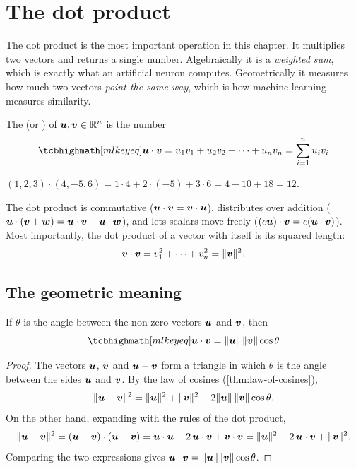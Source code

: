 \section{The dot product}\label{sec:dot-product}

\begin{motivation}
The dot product is the most important operation in this chapter. It multiplies
two vectors and returns a single number. Algebraically it is a
\emph{weighted sum}, which is exactly what an artificial neuron computes.
Geometrically it measures how much two vectors \emph{point the same way},
which is how machine learning measures similarity.
\end{motivation}

\begin{definition}\label{def:dot-product}
The  (or ) of $\bm{u}, \bm{v} \in \mathbb{R}^n$ is the
number
\[
  \keyeq{\vu \cdot \vv = u_1v_1 + u_2v_2 + \dots + u_nv_n
  = \sum_{i=1}^{n} u_iv_i}
\]
\end{definition}

\begin{example}
$(1, 2, 3)\cdot(4, -5, 6) = 1\cdot4 + 2\cdot(-5) + 3\cdot6 = 4 - 10 + 18 = 12$.
\end{example}

The dot product is commutative ($\bm{u}\cdot\bm{v} = \bm{v}\cdot\bm{u}$), distributes over
addition ($\bm{u}\cdot(\bm{v} + \bm{w}) = \bm{u}\cdot\bm{v} + \bm{u}\cdot\bm{w}$), and lets scalars
move freely ($(c\bm{u})\cdot\bm{v} = c(\bm{u}\cdot\bm{v})$). Most importantly, the dot
product of a vector with itself is its squared length:
\[
  \bm{v} \cdot \bm{v} = v_1^2 + \dots + v_n^2 = \lVert\bm{v}\rVert^2 .
\]

\subsection{The geometric meaning}

\begin{theorem}\label{thm:dot-geometric}
If $\theta$ is the angle between the non-zero vectors $\bm{u}$ and $\bm{v}$, then
\[
  \keyeq{\vu\cdot\vv = \norm{\vu}\,\norm{\vv}\cos\theta}
\]
\end{theorem}

\begin{proof}
The vectors $\bm{u}$, $\bm{v}$ and $\bm{u} - \bm{v}$ form a triangle in which $\theta$ is
the angle between the sides $\bm{u}$ and $\bm{v}$. By the law of cosines
(\cref{thm:law-of-cosines}),
\[
  \lVert\bm{u} - \bm{v}\rVert^2 = \lVert\bm{u}\rVert^2 + \lVert\bm{v}\rVert^2
  - 2\lVert\bm{u}\rVert\,\lVert\bm{v}\rVert\cos\theta .
\]
On the other hand, expanding with the rules of the dot product,
\[
  \lVert\bm{u} - \bm{v}\rVert^2 = (\bm{u} - \bm{v})\cdot(\bm{u} - \bm{v})
  = \bm{u}\cdot\bm{u} - 2\,\bm{u}\cdot\bm{v} + \bm{v}\cdot\bm{v}
  = \lVert\bm{u}\rVert^2 - 2\,\bm{u}\cdot\bm{v} + \lVert\bm{v}\rVert^2 .
\]
Comparing the two expressions gives $\bm{u}\cdot\bm{v} = \lVert\bm{u}\rVert\lVert\bm{v}\rVert\cos\theta$.
\end{proof}


